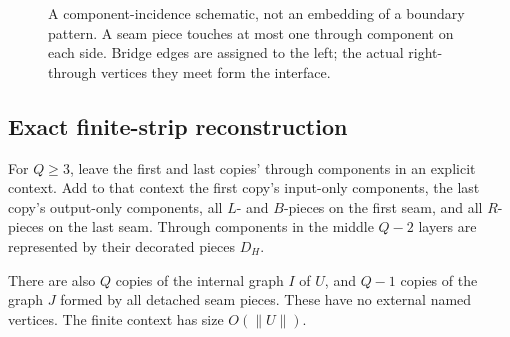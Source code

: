 \documentclass[11pt]{article}
\theoremstyle{remark}\newtheorem{remark}[theorem]{Remark}
\newcommand{\size}[1]{\lVert #1\rVert}
\begin{document}
\begin{figure}[ht]
\centering
{}
\caption{A component-incidence schematic, not an embedding of a boundary pattern. A seam piece touches at most one through component on each side. Bridge edges are assigned to the left; the actual right-through vertices they meet form the interface.}
\end{figure}

\subsection{Exact finite-strip reconstruction}
For $Q\ge3$, leave the first and last copies' through components in an explicit context. Add to that context the first copy's input-only components, the last copy's output-only components, all $L$- and $B$-pieces on the first seam, and all $R$-pieces on the last seam. Through components in the middle $Q-2$ layers are represented by their decorated pieces $D_H$.

There are also $Q$ copies of the internal graph $I$ of $U$, and $Q-1$ copies of the graph $J$ formed by all detached seam pieces. These have no external named vertices. The finite context has size $O(\size{U})$.
\end{document}

